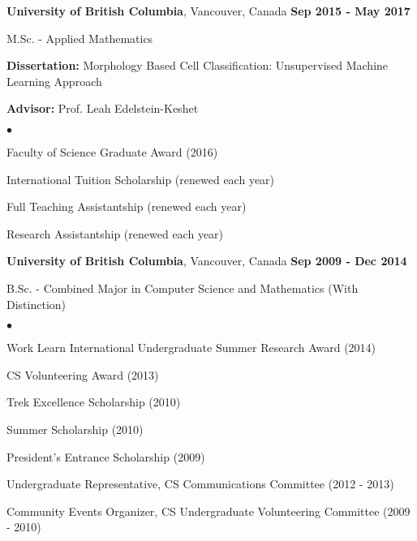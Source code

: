 \documentclass[margin,line]{res}
\newenvironment{list1}{
  \begin{list}{\ding{113}}{
      \setlength{\itemsep}{0in}
      \setlength{\parsep}{0in} \setlength{\parskip}{0in}
      \setlength{\topsep}{0in} \setlength{\partopsep}{0in}
      \setlength{\leftmargin}{0.17in}}}{\end{list}}
\newenvironment{list2}{
  \begin{list}{$\bullet$}{
      \setlength{\itemsep}{0in}
      \setlength{\parsep}{0in} \setlength{\parskip}{0in}
      \setlength{\topsep}{0in} \setlength{\partopsep}{0in}
      \setlength{\leftmargin}{0.2in}}}{\end{list}}
\newenvironment{list3}{
  \begin{list}{\textopenbullet}{
      \setlength{\itemsep}{0in}
      \setlength{\parsep}{0in} \setlength{\parskip}{0in}
      \setlength{\topsep}{0in} \setlength{\partopsep}{0in}
      \setlength{\leftmargin}{0.1in}}}{\end{list}}
\begin{document}
\begin{resume}
{\bf University of British Columbia}, Vancouver, Canada  \hfill {\bf Sep 2015 - May 2017}\\
\vspace*{-.2cm}
\begin{list1}
\item[] M.Sc. - Applied Mathematics
\vspace*{.1cm}
\item[] {\bf Dissertation:} Morphology Based Cell Classification: Unsupervised Machine Learning Approach
\vspace*{-0.3cm}
\item[] {\bf Advisor:} Prof. Leah Edelstein-Keshet
\begin{list2}
\vspace*{.1cm}
\setlength\itemsep{0.25em}
\item Faculty of Science Graduate Award (2016)
\item International Tuition Scholarship (renewed each year)
\item Full Teaching Assistantship (renewed each year)
\item Research Assistantship (renewed each year)
\end{list2}
\end{list1}
\vspace*{.2cm}

{\bf University of British Columbia}, Vancouver, Canada  \hfill {\bf Sep 2009 - Dec 2014}\\
\vspace*{-.2cm}
\begin{list1}
\item[] B.Sc. - Combined Major in Computer Science and Mathematics (With Distinction)
\begin{list2}
\vspace*{.1cm}
\setlength\itemsep{0.25em}
\item Work Learn International Undergraduate Summer Research Award (2014)
\item CS Volunteering Award (2013)
\item Trek Excellence Scholarship (2010)
\item Summer Scholarship (2010)
\item President's Entrance Scholarship (2009)
\begin{list3}
\vspace*{.1cm}
\setlength\itemsep{0.25em}
\item Undergraduate Representative, CS Communications Committee (2012 - 2013)
\item Community Events Organizer, CS Undergraduate Volunteering Committee (2009 - 2010)
\end{list3}
\end{list2}
\end{list1}


\end{resume}
\end{document}

